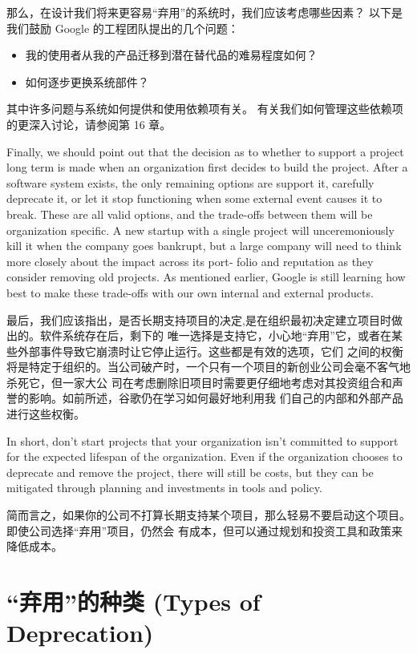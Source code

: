 \documentclass[10pt,a4paper,UTF8]{ctexart}
\begin{document}
那么，在设计我们将来更容易“弃用”的系统时，我们应该考虑哪些因素？ 以下是我们鼓励 Google 的工程团队提出的几个问题：

\begin{itemize}
\item 我的使用者从我的产品迁移到潜在替代品的难易程度如何？
\item 如何逐步更换系统部件？
\end{itemize}

其中许多问题与系统如何提供和使用依赖项有关。 有关我们如何管理这些依赖项的更深入讨论，请参阅第 16 章。

Finally, we should point out that the decision as to whether to support a project long term is made
when an organization first decides to build the project. After a software system exists, the only
remaining options are support it, carefully deprecate it, or let it stop functioning when some
external event causes it to break. These are all valid options, and the trade-offs between them will
be organization specific. A new startup with a single project will unceremoniously kill it when the
company goes bankrupt, but a large company will need to think more closely about the impact across
its port‐ folio and reputation as they consider removing old projects. As mentioned earlier, Google
is still learning how best to make these trade-offs with our own internal and external products.

最后，我们应该指出，是否长期支持项目的决定,是在组织最初决定建立项目时做出的。软件系统存在后，剩下的
唯一选择是支持它，小心地“弃用”它，或者在某些外部事件导致它崩溃时让它停止运行。这些都是有效的选项，它们
之间的权衡将是特定于组织的。当公司破产时，一个只有一个项目的新创业公司会毫不客气地杀死它，但一家大公
司在考虑删除旧项目时需要更仔细地考虑对其投资组合和声誉的影响。如前所述，谷歌仍在学习如何最好地利用我
们自己的内部和外部产品进行这些权衡。


In short, don’t start projects that your organization isn’t committed to support for the expected
lifespan of the organization. Even if the organization chooses to deprecate and remove the project,
there will still be costs, but they can be mitigated through planning and investments in tools and
policy.

简而言之，如果你的公司不打算长期支持某个项目，那么轻易不要启动这个项目。即使公司选择“弃用”项目，仍然会
有成本，但可以通过规划和投资工具和政策来降低成本。

\section{“弃用”的种类 (Types of Deprecation)}
\label{sec:orga83af42}
\end{document}
